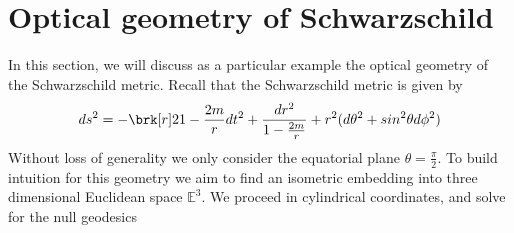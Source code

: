 %
%

\section{Optical geometry of Schwarzschild}
In this section, we will discuss as a particular example the optical geometry of the Schwarzschild metric. Recall that the Schwarzschild metric is given by
\begin{equation}\label{}
ds^2 = -\brk[r]2{1-\frac{2m}{r}} dt^2 + \frac{dr^2}{1-\frac{2m}{r}} + r^2(d\theta^2 + sin^2\theta d\phi^2)
\end{equation}
Without loss of generality we only consider the equatorial plane $\theta=\frac{\pi}{2}$. To build intuition for this geometry we aim to find an isometric embedding into three dimensional Euclidean space $\mathbb{E}^3$. We proceed in cylindrical coordinates, and solve for the null geodesics

